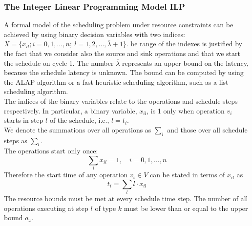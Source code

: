 \subsubsection{The Integer Linear Programming Model ILP}
A  formal model of the scheduling problem under resource constraints can be achieved by using binary decision variables with two indices: $ X = \lbrace x_{il}; i=0, 1,...,n;\: l=1, 2,..., \overline{\lambda}+1 \rbrace $. he range of the indexes is justified by the fact that we consider also the source and sink operations and that we start the schedule on cycle  1.  The number  $ \overline{\lambda} $ represents an upper bound on the latency, because the schedule latency is unknown. The bound can be computed by using the ALAP algorithm or a fast heuristic scheduling algorithm, such as a list scheduling algorithm.\\
The indices of the binary variables relate to the operations and schedule steps respectively. In particular, a binary variable,  $ x_{il} $,  is 1 only when operation  $ v_i $  starts in step $ l $ of the schedule, i.e.,  $ l = t_i $.\\
We denote the summations over all operations as $ \sum\limits_i $ and those over all schedule steps as $ \sum\limits_l $.\\
The operations start only once:
\[\sum\limits_l x_{il} = 1,\quad i=0,1,...,n\]
Therefore the start time of any operation $ v_i \in V $ can be stated in terms of  $ x_{il} $  as
\[t_i = \sum\limits_l l \cdot x_{il} \]
The resource bounds must be met at every schedule time step. The number of all operations executing at step $ l $ of type $ k $ must be lower than or equal to the upper bound  $ a_x $.

